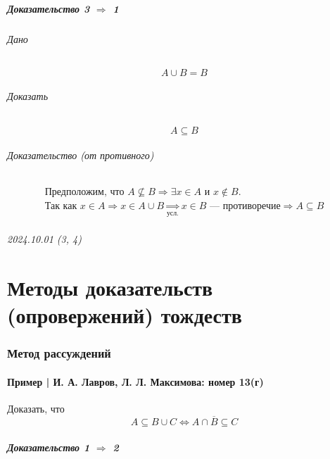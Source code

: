 \documentclass{article}
\begin{document}
\subsubsection{Доказательство 3 $\Rightarrow$ 1}
\paragraph{Дано}
\[
    A \cup B = B
\]

\paragraph{Доказать}
\[
    A \subseteq B
\]

\paragraph{Доказательство (от противного)}
\begin{gather*}
    \text{Предположим, что } A \nsubseteq B \Rightarrow \exists x \in A \text{ и } x \notin B. \\ 
    \text{Так как } x \in A \Rightarrow x \in A \cup B \underset{\text{усл.}}{\Rightarrow} x \in B \text{ --- противоречие} \Rightarrow A \subseteq B
\end{gather*}




\newpage
\paragraph{2024.10.01 (3, 4)}
\part{Методы доказательств (опровержений) тождеств}

\section{Метод рассуждений}

\subsection{Пример | И. А. Лавров, Л. Л. Максимова: номер 13(г)}
Доказать, что 
\[
    A \subseteq B \cup C \Leftrightarrow A \cap \overline{B} \subseteq C
\]

\subsubsection{Доказательство 1 $\Rightarrow$ 2}
\end{document}
